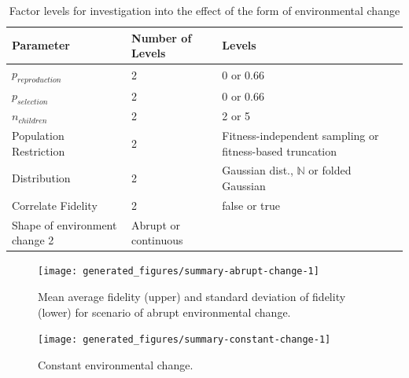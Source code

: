 \begin{table} %
	\begin{center}
		\caption{Factor levels for investigation into the effect of the form of environmental change}
		\begin{tabular}{@{}llp{6cm}@{}}
			\toprule
			Parameter              & Number of Levels & Levels                                                   \\
			\midrule
			$p_{reproduction}$     & 2                & 0 or 0.66                                                \\
			$p_{selection}$        & 2                & 0 or 0.66                                                \\
			$n_{children}$         & 2                & 2 or 5                                                   \\
			Population Restriction & 2                & Fitness-independent sampling or fitness-based truncation \\
			Distribution           & 2                & Gaussian dist., $\mathbb{N}$ or folded Gaussian          \\
			Correlate Fidelity     & 2                & false or true                                            \\
			Shape of environment change		2&	Abrupt or continuous\\
			\bottomrule
		\end{tabular}
	\end{center}
\end{table}

\begin{knitrout}
\color{fgcolor}\begin{figure}[htp]
\texttt{[image: generated\_figures/summary-abrupt-change-1]} \caption[Mean average fidelity (upper) and standard deviation of fidelity (lower) for scenario of abrupt environmental change]{Mean average fidelity (upper) and standard deviation of fidelity (lower) for scenario of abrupt environmental change.}\label{fig:summary-abrupt-change}
\end{figure}


\end{knitrout}

\begin{knitrout}
\color{fgcolor}\begin{figure}[htp]
\texttt{[image: generated\_figures/summary-constant-change-1]} \caption[Constant environmental change]{Constant environmental change.}\label{fig:summary-constant-change}
\end{figure}


\end{knitrout}

